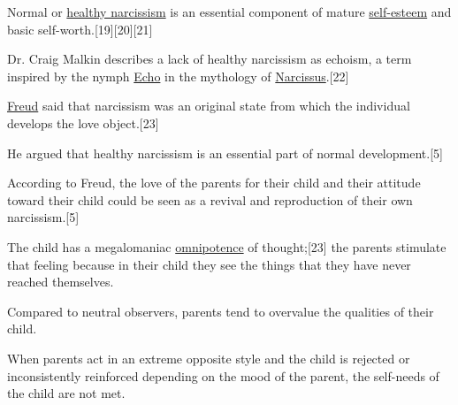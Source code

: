 \documentclass[oneside]{book}
\numberwithin{equation}{section}
\begin{document}
%
Normal or \href{https://en.wikipedia.org/wiki/Healthy_narcissism}{healthy narcissism} is an essential component of mature \href{https://en.wikipedia.org/wiki/Self-esteem}{self-esteem} and basic self-worth.[19][20][21]

Dr. Craig Malkin describes a lack of healthy narcissism as echoism, a term inspired by the nymph \href{https://en.wikipedia.org/wiki/Echo_(mythology)}{Echo} in the mythology of \href{https://en.wikipedia.org/wiki/Narcissus_(mythology)}{Narcissus}.[22]

%
\href{https://en.wikipedia.org/wiki/Freud}{Freud} said that narcissism was an original state from which the individual develops the love object.[23]

He argued that healthy narcissism is an essential part of normal development.[5]

According to Freud, the love of the parents for their child and their attitude toward their child could be seen as a revival and reproduction of their own narcissism.[5]

The child has a megalomaniac \href{https://en.wikipedia.org/wiki/Omnipotence}{omnipotence} of thought;[23] the parents stimulate that feeling because in their child they see the things that they have never reached themselves.

Compared to neutral observers, parents tend to overvalue the qualities of their child.

When parents act in an extreme opposite style and the child is rejected or inconsistently reinforced depending on the mood of the parent, the self-needs of the child are not met.
\end{document}

